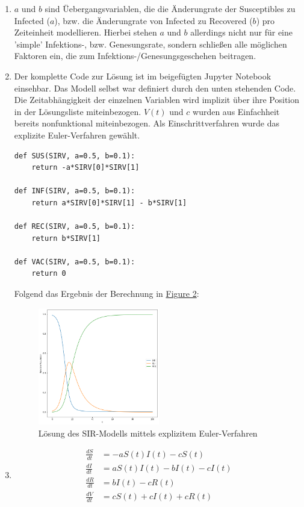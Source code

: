 \documentclass[german]{uebung}
\begin{document}
\begin{exercise}{3}
	\begin{enumerate}[label=(\alph*)]
		\item $a$ und $b$ sind \"Uebergangsvariablen, die die \"Anderungrate
			der Susceptibles zu Infected ($a$), bzw. die \"Anderungrate
			von Infected zu Recovered ($b$) pro Zeiteinheit modellieren.
			Hierbei stehen $a$ und $b$ allerdings nicht nur f\"ur eine
			'simple' Infektions-, bzw. Genesungsrate, sondern schlie{\ss}en
			alle m\"oglichen Faktoren ein, die zum Infektions-/Genesungsgeschehen
			beitragen.
		\item Der komplette Code zur L\"osung ist im beigef\"ugten Jupyter Notebook einsehbar.
			Das Modell selbst war definiert durch den unten stehenden Code. Die Zeitabh\"angigkeit
			der einzelnen Variablen wird implizit \"uber ihre Position in
			der L\"osungsliste miteinbezogen. $V(t)$ und $c$ wurden aus
			Einfachheit bereits nonfunktional miteinbezogen. Als Einschrittverfahren
			wurde das explizite Euler-Verfahren gew\"ahlt.

			\begin{lstlisting}[frame=single]
def SUS(SIRV, a=0.5, b=0.1):
    return -a*SIRV[0]*SIRV[1]

def INF(SIRV, a=0.5, b=0.1):
    return a*SIRV[0]*SIRV[1] - b*SIRV[1]

def REC(SIRV, a=0.5, b=0.1):
    return b*SIRV[1]

def VAC(SIRV, a=0.5, b=0.1):
    return 0
			\end{lstlisting}

			Folgend das Ergebnis der Berechnung in \hyperref[fig:p2]{Figure 2}:
			\begin{figure}[h!]
				\centering
				\includegraphics[width=0.5\textwidth]{plot2.png}
				\caption{L\"osung des SIR-Modells mittels explizitem Euler-Verfahren}
				\label{fig:p2}
			\end{figure}
		\item \begin{align}
				\frac{dS}{dt} &= -aS(t)I(t) - cS(t)\\
				\frac{dI}{dt} &= aS(t)I(t) - bI(t) - cI(t)\\
				\frac{dR}{dt} &= bI(t) - cR(t)\\
				\frac{dV}{dt} &= cS(t) + cI(t) + cR(t)
			\end{align}


\end{enumerate}
\end{exercise}
\end{document}
